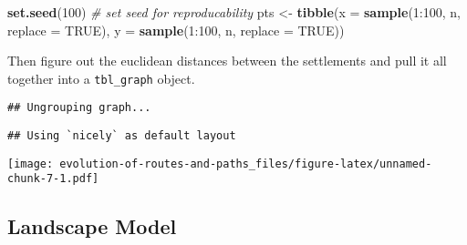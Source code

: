 \documentclass[]{elsarticle} %
\makeatletter
\newenvironment{Shaded}{\begin{snugshade}}{\end{snugshade}}
\newcommand{\KeywordTok}[1]{\textcolor[rgb]{0.13,0.29,0.53}{\textbf{{#1}}}}
\newcommand{\DataTypeTok}[1]{\textcolor[rgb]{0.13,0.29,0.53}{{#1}}}
\newcommand{\DecValTok}[1]{\textcolor[rgb]{0.00,0.00,0.81}{{#1}}}
\newcommand{\StringTok}[1]{\textcolor[rgb]{0.31,0.60,0.02}{{#1}}}
\newcommand{\CommentTok}[1]{\textcolor[rgb]{0.56,0.35,0.01}{\textit{{#1}}}}
\newcommand{\OtherTok}[1]{\textcolor[rgb]{0.56,0.35,0.01}{{#1}}}
\newcommand{\NormalTok}[1]{{#1}}
\def\maxwidth{\ifdim\Gin@nat@width>\linewidth\linewidth
\else\Gin@nat@width\fi}
\let\Oldincludegraphics\includegraphics
\renewcommand{\includegraphics}[1]{\Oldincludegraphics[width=\maxwidth]{#1}}
\makeatother
\begin{document}
\begin{Shaded}
\begin{Highlighting}[]
\KeywordTok{set.seed}\NormalTok{(}\DecValTok{100}\NormalTok{) }\CommentTok{# set seed for reproducability}
\NormalTok{pts <-}\StringTok{ }\KeywordTok{tibble}\NormalTok{(}\DataTypeTok{x =} \KeywordTok{sample}\NormalTok{(}\DecValTok{1}\NormalTok{:}\DecValTok{100}\NormalTok{, n, }\DataTypeTok{replace =} \OtherTok{TRUE}\NormalTok{),}
              \DataTypeTok{y =} \KeywordTok{sample}\NormalTok{(}\DecValTok{1}\NormalTok{:}\DecValTok{100}\NormalTok{, n, }\DataTypeTok{replace =} \OtherTok{TRUE}\NormalTok{))}
\end{Highlighting}
\end{Shaded}

Then figure out the euclidean distances between the settlements and pull
it all together into a \texttt{tbl\_graph} object.

\begin{Shaded}
\end{Shaded}

\begin{verbatim}
## Ungrouping graph...
\end{verbatim}

\begin{verbatim}
## Using `nicely` as default layout
\end{verbatim}

\texttt{[image: evolution-of-routes-and-paths\_files/figure-latex/unnamed-chunk-7-1.pdf]}

\subsection{Landscape Model}\label{landscape-model}
\end{document}
